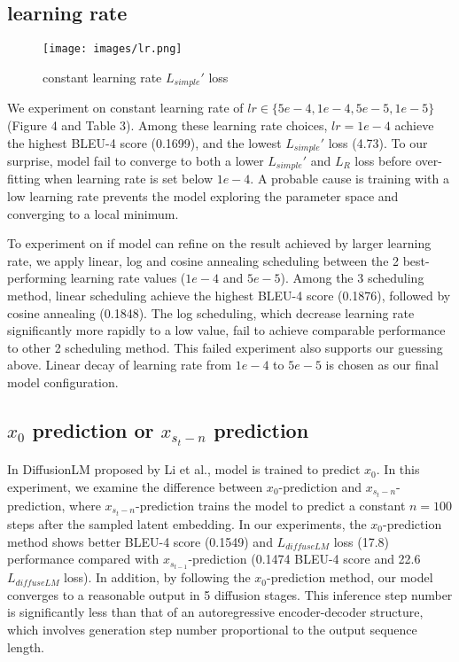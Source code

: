 \documentclass{article}
\begin{document}
\subsection{learning rate}
\label{sec:lr-exp}
\begin{figure}
  \centering
  \texttt{[image: images/lr.png]}
  \caption{constant learning rate $L_{simple}'$ loss}
  \label{fig:fusion}
\end{figure}

We experiment on constant learning rate of $lr \in \{5e-4, 1e-4, 5e-5, 1e-5\}$ (Figure 4 and Table 3). Among these learning rate choices, $lr = 1e-4$ achieve the highest BLEU-4 score (0.1699), and the lowest $L_{simple}'$ loss (4.73). To our surprise, model fail to converge to both a lower $L_{simple}'$ and $L_R$ loss before over-fitting when learning rate is set below $1e-4$. A probable cause is training with a low learning rate prevents the model exploring the parameter space and converging to a local minimum.

To experiment on if model can refine on the result achieved by larger learning rate, we apply linear, log and cosine annealing scheduling between the 2 best-performing learning rate values ($1e-4$ and $5e-5$). Among the 3 scheduling method, linear scheduling achieve the highest BLEU-4 score (0.1876), followed by cosine annealing (0.1848). The log scheduling, which decrease learning rate significantly more rapidly to a low value, fail to achieve comparable performance to other 2 scheduling method. This failed experiment also supports our guessing above. Linear decay of learning rate from $1e-4$ to $5e-5$ is chosen as our final model configuration. 

\subsection{$x_0$ prediction or $x_{s_t-n}$ prediction}
\label{sec:x0-exp}
In DiffusionLM proposed by Li et al.\cite{diffuselm}, model is trained to predict $x_0$. In this experiment, we examine the difference between $x_0$-prediction and $x_{s_t-n}$-prediction, where $x_{s_t-n}$-prediction trains the model to predict a constant $n = 100$ steps after the sampled latent embedding. In our experiments, the $x_0$-prediction method shows better BLEU-4 score (0.1549) and $L_{diffuseLM}$ loss (17.8) performance compared with $x_{s_{t-1}}$-prediction (0.1474 BLEU-4 score and 22.6 $L_{diffuseLM}$ loss). In addition, by following the $x_0$-prediction method, our model converges to a reasonable output in 5 diffusion stages. This inference step number is significantly less than that of an autoregressive encoder-decoder structure, which involves generation step number proportional to the output sequence length.
\end{document}
